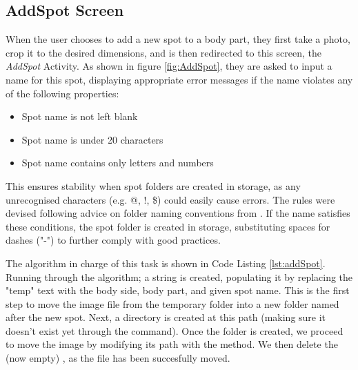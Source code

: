 \subsection{AddSpot Screen}

When the user chooses to add a new spot to a body part, they first take a photo, crop it to the desired dimensions, and is then redirected to this screen, the \emph{AddSpot} Activity. As shown in figure \ref{fig:AddSpot}, they are asked to input a name for this spot, displaying appropriate error messages if the name violates any of the following properties:
\begin{itemize}
    \item Spot name is not left blank
    \item Spot name is under 20 characters
    \item Spot name contains only letters and numbers
\end{itemize}
This ensures stability when spot folders are created in storage, as any unrecognised characters (e.g. @, !, \$) could easily cause errors. The rules were devised following advice on folder naming conventions from \cite{santaguida_2011}. If the name satisfies these conditions, the spot folder is created in storage, substituting spaces for dashes ("-") to further comply with good practices.

The algorithm in charge of this task is shown in Code Listing \ref{lst:addSpot}. Running through the algorithm; a  string is created, populating it by replacing the "temp" text with the body side, body part, and given spot name. This is the first step to move the image file from the temporary folder into a new folder named after the new spot. Next, a directory  is created at this path (making sure it doesn't exist yet through the  command). Once the folder is created, we proceed to move the image by modifying its path with the  method. We then delete the (now empty) , as the file has been succesfully moved.

